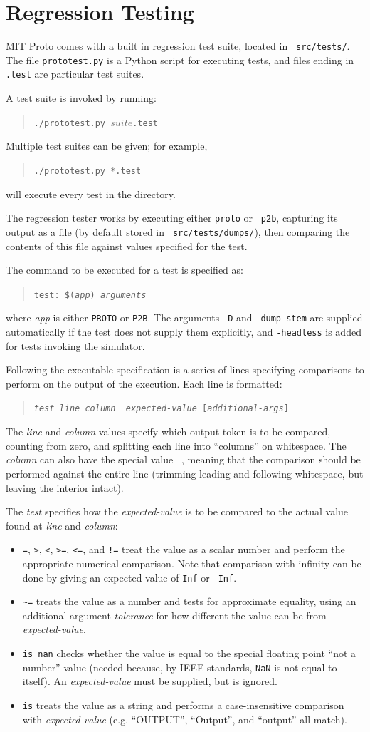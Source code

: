 \documentclass{article}
\newcommand\code[1]{\begin{quote}\var{#1}\end{quote}}
\newcommand\var[1]{{\tt #1}}
\begin{document}
\section{Regression Testing}

MIT Proto comes with a built in regression test suite, located in {\tt
  src/tests/}.  The file {\tt prototest.py} is a Python script for
executing tests, and files ending in {\tt .test} are particular test suites.

A test suite is invoked by running: \code{./prototest.py $suite$.test}
Multiple test suites can be given; for example, \code{./prototest.py
  *.test} will execute every test in the directory.

The regression tester works by executing either {\tt proto} or {\tt
  p2b}, capturing its output as a file (by default stored in {\tt
  src/tests/dumps/}), then comparing the contents of this file against
values specified for the test.

The command to be executed for a test is specified as: \code{test:
  \$({\it app}) {\it arguments}} where {\it app} is either \var{PROTO}
or \var{P2B}.  The arguments \var{-D} and \var{-dump-stem} are
supplied automatically if the test does not supply them explicitly,
and \var{-headless} is added for tests invoking the simulator.

Following the executable specification is a series of lines specifying
comparisons to perform on the output of the execution.  Each line is
formatted: \code{{\it test} {\it line} {\it column} {\it
    expected-value} [{\it additional-args}]}

The {\it line} and {\it column} values specify which output token is to
be compared, counting from zero, and splitting each line into
``columns'' on whitespace.  The {\it column} can also have the special
value \var{\_}, meaning that the comparison should be performed
against the entire line (trimming leading and following whitespace,
but leaving the interior intact).

The {\it test} specifies how the {\it expected-value} is to be
compared to the actual value found at {\it line} and {\it column}:
\begin{itemize}
\item \var{=}, \var{>}, \var{<}, \var{>=}, \var{<=}, and \var{!=}
  treat the value as a scalar number and perform the appropriate
  numerical comparison.  Note that comparison with infinity can be
  done by giving an expected value of \var{Inf} or \var{-Inf}.
\item \var{\textasciitilde =} treats the value as a number and tests for approximate
  equality, using an additional argument {\it tolerance} for how
  different the value can be from {\it expected-value}.
\item \var{is\_nan} checks whether the value is equal to the special
  floating point ``not a number'' value (needed because, by IEEE
  standards, \var{NaN} is not equal to itself).  An {\it
    expected-value} must be supplied, but is ignored.
\item \var{is} treats the value as a string and performs a
  case-insensitive comparison with {\it expected-value}
  (e.g. ``OUTPUT'', ``Output'', and ``output'' all match).
\end{itemize}
  
\end{document}
